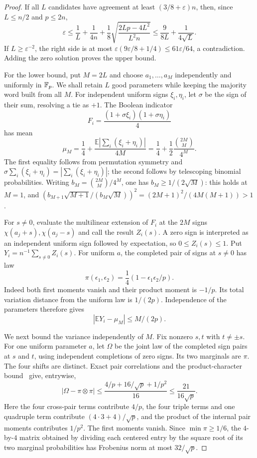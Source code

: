 \begin{proof}
If all $L$ candidates have agreement at least
$(3/8+\varepsilon)n$, then, since $L\le n/2$ and $p\le2n$,
\[
 \varepsilon
 \le\frac1L+\frac1{4n}
        +\frac18\sqrt{\frac{2Lp-4L^2}{L^2n}}
 \le\frac9{8L}+\frac1{4\sqrt L}.
\]
If $L\ge\varepsilon^{-2}$, the right side is at most
$\varepsilon(9\varepsilon/8+1/4)\le61\varepsilon/64$,
a contradiction.  Adding the zero solution proves the upper bound.

For the lower bound, put $M=2L$ and choose $a_1,\ldots,a_M$
independently and uniformly in $\mathbb F_p$.  We shall retain $L$ good
parameters while keeping the majority word built from all $M$.
For independent uniform signs $\xi_i,\eta_i$, let $\sigma$ be the
sign of their sum, resolving a tie as $+1$.  The Boolean indicator
\[
 F_i=\frac{(1+\sigma\xi_i)(1+\sigma\eta_i)}4
\]
has mean
\begin{equation}\label{eq:dickson-majority-bias}
 \mu_M=\frac14+
 \frac{\mathbb E|\sum_i(\xi_i+\eta_i)|}{4M}
 =\frac14+\frac12\frac{\binom{2M}{M}}{4^M}.
\end{equation}
The first equality follows from permutation symmetry and
$\sigma\sum_i(\xi_i+\eta_i)=|\sum_i(\xi_i+\eta_i)|$;
the second follows by telescoping binomial probabilities.
Writing $b_M=\binom{2M}{M}/4^M$, one has
$b_M\ge1/(2\sqrt M)$: this holds at $M=1$, and
$(b_{M+1}\sqrt{M+1}/(b_M\sqrt M))^2
=(2M+1)^2/(4M(M+1))>1$.

For $s\ne0$, evaluate the multilinear extension of $F_i$ at the
$2M$ signs $\chi(a_j+s),\chi(a_j-s)$ and call the result $Z_i(s)$.
A zero sign is interpreted as an independent uniform sign followed by
expectation, so $0\le Z_i(s)\le1$.
Put $Y_i=n^{-1}\sum_{s\ne0}Z_i(s)$.
For uniform $a$, the completed pair of signs at $s\ne0$ has law
\[
 \pi(\epsilon_1,\epsilon_2)
 =\frac14(1-\epsilon_1\epsilon_2/p).
\]
Indeed both first moments vanish and their product moment is $-1/p$.
Its total variation distance from the uniform law is $1/(2p)$.
Independence of the parameters therefore gives
\begin{equation}\label{eq:dickson-majority-mean}
 |\mathbb E Y_i-\mu_M|\le M/(2p).
\end{equation}

We next bound the variance independently of $M$.
Fix nonzero $s,t$ with $t\ne\pm s$.
For one uniform parameter $a$, let $\Omega$ be the joint law of the
completed sign pairs at $s$ and $t$, using independent completions
of zero signs.  Its two marginals are $\pi$.
The four shifts are distinct.  Exact pair correlations and the
product-character bound~\cite[Lemma~17]{bgks-shifted} give, entrywise,
\[
 |\Omega-\pi\otimes\pi|
 \le\frac{4/p+16/\sqrt p+1/p^2}{16}
 \le\frac{21}{16\sqrt p}.
\]
Here the four cross-pair terms contribute $4/p$, the four triple
terms and one quadruple term contribute $(4\cdot3+4)/\sqrt p$,
and the product of the internal pair moments contributes $1/p^2$.
The first moments vanish.  Since $\min\pi\ge1/6$, the $4$-by-$4$
matrix obtained by dividing each centered entry by the square root
of its two marginal probabilities has Frobenius norm at most
$32/\sqrt p$.


\end{proof}
